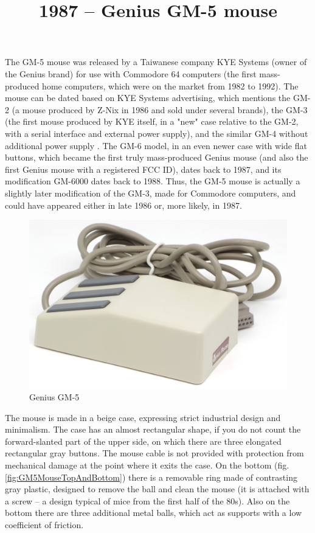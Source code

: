 \documentclass[11pt, a4paper]{article}
\begin{document}
\title{1987 -- Genius GM-5 mouse}
\date{}
\maketitle
{}

The GM-5 mouse was released by a Taiwanese company KYE Systems (owner of the Genius brand) for use with Commodore 64 computers (the first mass-produced home computers, which were on the market from 1982 to 1992). The mouse can be dated based on KYE Systems advertising, which mentions the GM-2 (a mouse produced by Z-Nix in 1986 and sold under several brands), the GM-3 (the first mouse produced by KYE itself, in a "new" case relative to the GM-2, with a serial interface and external power supply), and the similar GM-4 without additional power supply \cite{YourComputer}. The GM-6 model, in an even newer case with wide flat buttons, which became the first truly mass-produced Genius mouse (and also the first Genius mouse with a registered FCC ID), dates back to 1987, and its modification GM-6000 dates back to 1988. Thus, the GM-5 mouse is actually a slightly later modification of the GM-3, made for Commodore computers, and could have appeared either in late 1986 or, more likely, in 1987.

\begin{figure}[h]
   \centering
    \includegraphics[scale=0.9]{1987_genius_gm5_mouse/pic_30.jpg}
    \caption{Genius GM-5}
    \label{fig:GM5MousePic}
\end{figure}

The mouse is made in a beige case, expressing strict industrial design and minimalism. The case has an almost rectangular shape, if you do not count the forward-slanted part of the upper side, on which there are three elongated rectangular gray buttons. The mouse cable is not provided with protection from mechanical damage at the point where it exits the case. On the bottom (fig. \ref{fig:GM5MouseTopAndBottom}) there is a removable ring made of contrasting gray plastic, designed to remove the ball and clean the mouse (it is attached with a screw -- a design typical of mice from the first half of the 80s). Also on the bottom there are three additional metal balls, which act as supports with a low coefficient of friction.
\end{document}
